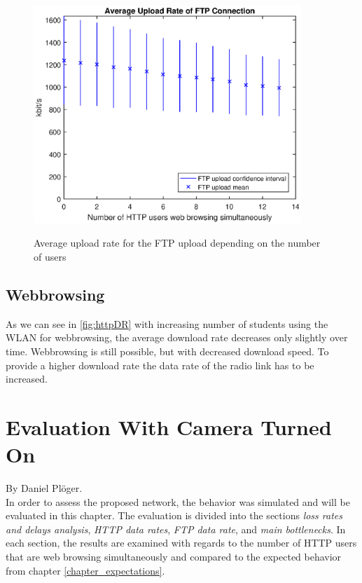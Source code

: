 \documentclass[a4paper,10pt]{book}\usepackage{graphicx}
\begin{document}
\begin{figure}[!ht]
  \centering
    \includegraphics[width=0.9\textwidth]{off_ftp_upload.eps}
    \label{fig:ftpUpR}
    \caption{Average upload rate for the FTP upload depending on the number of users}
\end{figure}

\section{Webbrowsing}
As we can see in \ref{fig:httpDR} with increasing number of students using the WLAN for webbrowsing, the average download rate decreases only slightly over time. Webbrowsing is still possible, but with decreased download speed.
To provide a higher download rate the data rate of the radio link has to be increased. 

\chapter{Evaluation With Camera Turned On}
By Daniel Plöger.\\

In order to assess the proposed network, the behavior was simulated and will be evaluated in this chapter. The evaluation is divided into the sections \textit{loss rates and delays analysis}, \textit{HTTP data rates}, \textit{FTP data rate}, and \textit{main bottlenecks}. In each section, the results are examined with regards to the number of HTTP users that are web browsing simultaneously and compared to the expected behavior from chapter \ref{chapter_expectations}.
\end{document}
